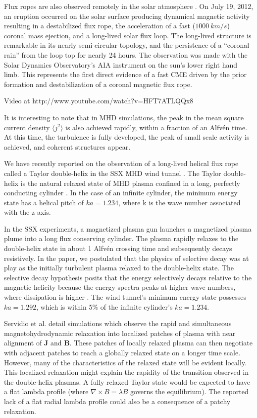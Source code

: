 \documentclass[12pt]{iopart}
\begin{document}
Flux ropes are also observed remotely in the solar atmosphere \cite{Patsourakos13}.  On July 19, 2012, an eruption occurred on the solar surface producing dynamical magnetic activity resulting in a destabilized flux rope, the acceleration of a fast ($1000~km/s$) coronal mass ejection, and a long-lived solar flux loop.  The long-lived structure is remarkable in its nearly semi-circular topology, and the persistence of a ``coronal rain'' from the loop top for nearly 24 hours.  The observation was made with the Solar Dynamics Observatory's AIA instrument on the sun's lower right hand limb.   This represents the first direct evidence of a fast CME driven by the prior formation and destabilization of a coronal magnetic flux rope.

Video at http://www.youtube.com/watch?v=HFT7ATLQQx8

It is interesting to note that in MHD simulations, the peak in the mean square current density $\langle j^2 \rangle$ is also achieved rapidly, within a fraction of an Alfv\'en time. At this time, the turbulence is fully developed, the peak of small scale activity is achieved, and coherent structures appear. 

We have recently reported on the observation of a long-lived helical flux rope called a Taylor double-helix in the SSX MHD wind tunnel \cite{Gray13}.  The Taylor double-helix is the natural relaxed state of MHD plasma confined in a long, perfectly conducting cylinder \cite{Taylor86}.  In the case of an infinite cylinder, the minimum energy state has a helical pitch of $ ka = 1.234$, where k is the wave number associated with the z axis.  

In the SSX experiments, a magnetized plasma gun launches a magnetized plasma plume into a long flux conserving cylinder.  The plasma rapidly relaxes to the double-helix state in about 1 Alfv\'en crossing time and subsequently decays resistively.  In the paper, we postulated that the physics of selective decay was at play as the initially turbulent plasma relaxed to the double-helix state.  The selective decay hypothesis posits that the energy selectively decays relative to the magnetic helicity because the energy spectra peaks at higher wave numbers, where dissipation is higher \cite{Matthaeus80}.  The wind tunnel's minimum energy state possesses $ka = 1.292$, which is within 5\% of the infinite cylinder's $ka = 1.234$. 

Servidio et al. \cite{Servidio08,Servidio11} detail simulations which observe the rapid and simultaneous magnetohydrodynamic relaxation into localized patches of plasma with near alignment of {\bf J} and {\bf B}. These patches of locally relaxed plasma can then negotiate with adjacent patches to reach a globally relaxed state on a longer time scale.  However, many of the characteristics of the relaxed state will be evident locally. This localized relaxation might explain the rapidity of the transition observed in the double-helix plasmas.  A fully relaxed Taylor state would be expected to have a flat lambda profile (where $\nabla \times B = \lambda B$ governs the equilibrium).  The reported lack of a flat radial lambda profile could also be a consequence of a patchy relaxation.
\end{document}
